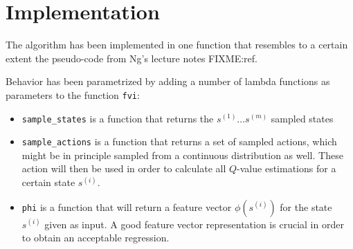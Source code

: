 \documentclass[a4paper, 12pt]{article}
\begin{document}
\section*{Implementation} 
The algorithm has been implemented in one function
that resembles to a certain extent the pseudo-code
from Ng's lecture notes FIXME:ref.

Behavior has been parametrized by adding a number of lambda functions
as parameters to the function \texttt{fvi}:

\begin{itemize}
\item \texttt{sample\_states} is a function that returns the $s^{(1)}\ldots s^{(m)}$ sampled states
\item \texttt{sample\_actions} is a function that returns a set of sampled actions, which might be in principle sampled from a continuous distribution as well.
These action will then be used in order to calculate all $Q$-value
estimations for a certain state $s^{(i)}$.
\item \texttt{phi} is a function that will return a feature vector
$\phi(s^{(i)})$ for the state $s^{(i)}$ given as input.
A good feature vector representation is
crucial in order to obtain an acceptable regression.
\end{itemize}
\end{document}

